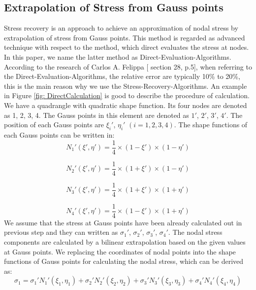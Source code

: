 \subsection{Extrapolation of Stress from Gauss points}
Stress recovery is an approach to achieve an approximation of nodal stress by extrapolation of stress from Gauss points. This method is regarded as advanced technique with respect to the method, which direct evaluates the stress at nodes. In this paper, we name the latter method as Direct-Evaluation-Algorithms. According to the research of Carlos A. Felippa [\cite{Felippa} section 28, p.5],  when referring to the Direct-Evaluation-Algorithms, the relative error are typically 10\% to 20\%, this is the main reason why we use the Stress-Recovery-Algorithms. An example in Figure \ref{fig: DirectCalculation} is good to describe the procedure of calculation. We have a quadrangle with quadratic shape function. Its four nodes are denoted as 1, 2, 3, 4. The Gauss points in this element are denoted as $1'$, $2'$, $3'$, $4'$. The position of each Gauss points are ${\xi_i}'$, ${\eta_i}'$ $\left(i = 1, 2, 3, 4\right)$. The shape functions of each Gauss points can be written in: 
\begin{equation}
{N_1}' \left(\xi',\eta'\right) = \frac{1}{4}\times\left(1 - {\xi}'\right) \times \left(1 - {\eta}' \right) 
\end{equation}  

\begin{equation}
{N_2}'\left(\xi',\eta'\right) = \frac{1}{4}\times\left(1 + {\xi}'\right) \times \left(1 - {\eta}' \right) 
\end{equation}  

\begin{equation}
{N_3}'\left(\xi',\eta'\right) = \frac{1}{4}\times\left(1 + {\xi}'\right) \times \left(1 + {\eta}' \right) 
\end{equation}  

\begin{equation}
{N_4}' \left(\xi',\eta'\right) = \frac{1}{4}\times\left(1 - {\xi}'\right) \times \left(1 + {\eta}' \right) 
\end{equation}
We assume that the stress at Gauss points have been already calculated out in previous step and they can written as ${\sigma_1}'$, ${\sigma_2}'$, ${\sigma_3}'$, ${\sigma_4}'$. The nodal stress components are calculated by a bilinear extrapolation based on the given values at Gauss points. We replacing the coordinates of nodal points into the shape functions of Gauss points for calculating the nodal stress, which can be derived as:   
\begin{equation}
\sigma_1 = {\sigma_1}' {N_1}'\left(\xi_1, \eta_1\right) + {\sigma_2}' {N_2}'\left(\xi_2, \eta_2\right) + {\sigma_3}' {N_3}'\left(\xi_3, \eta_3\right) + {\sigma_4}' {N_4}' \left(\xi_4, \eta_4\right)
\end{equation}

